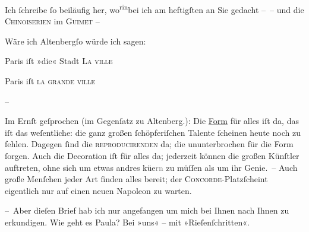 \pstart
           Ich ſchreibe ſo beiläufig her, wo\substVorne{}\textsuperscript{rin}\substDazwischen{}bei\substHinten{} ich am heftigſten an Sie gedacht – {\pb}– und die
                  \textsc{Chinoiserien} im \textsc{Guimet} –\pend
           
\pstart
           Wäre ich Altenbergſo würde ich sagen:\pend
           
\pstart
           Paris iſt »die« Stadt {\dotsfive}{ }\textsc{La ville}{ }{\dotsseven}\pend
           
\pstart
           Paris iſt \textsc{la grande
                  ville}{ }{\dotsfour}\pend
           
\pstart
           \numberlinefalse{}–\numberlinetrue{}\pend
           
\pstart
           Im Ernſt geſprochen (im Gegenſatz zu Altenberg.): Die \uline{Form} für alles iſt da, \introOben{}das iſt\introOben{} das weſentliche: die ganz {\pb}großen \introOben{}ſchöpferiſchen\introOben{} Talente
               ſcheinen heute noch zu fehlen. Dagegen ſind die \textsc{reproducirenden} da; die ununterbrochen für die Form ſorgen. Auch die
               Decoration iſt für alles da; jederzeit können die großen Künſtler auftreten, ohne
               sich um etwas andres kü{\geminationm}e\textcolor{gray}{rn} zu müſſen
               als um ihr Genie. – Auch große Menſchen {\pb}jeder Art
               finden alles bereit; der \textsc{Concorde}-Platzſcheint eigentlich nur auf einen neuen Napoleon zu warten.\pend
           
\pstart
           – Aber dieſen Brief hab ich nur angefangen um mich bei Ihnen nach Ihnen zu
               erkundigen. Wie geht es Paula? Bei »uns« – mit »Rieſen{\pb}ſchritten«.\pend
           
